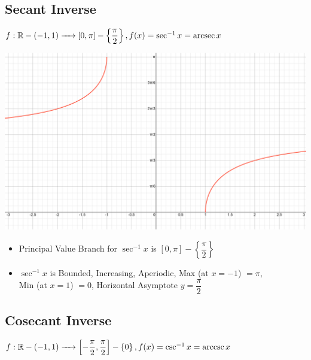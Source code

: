 \documentclass{article}
\begin{document}
\subsection{Secant Inverse}
$f: \mathbb{R}-(-1,1) \xrightarrow{\hspace{4mm}} \left[0,\pi\right]-\left\{\dfrac{\pi}{2}\right\}, f(x)=\sec^{-1}x=\arcsec x$
\begin{center}
    \includegraphics[scale=0.5]{graph_5.png}
\end{center}
\begin{itemize}
    \item Principal Value Branch for $\sec^{-1}x$ is $\left[0,\pi\right]-\left\{\dfrac{\pi}{2}\right\}$
    \item $\sec^{-1}x$ is Bounded, Increasing, Aperiodic, Max (at $x=-1$) $=\pi$, 
    \\Min (at $x=1$) $=0$, Horizontal Asymptote $y=\dfrac{\pi}{2}$
\end{itemize}
\newpage

\subsection{Cosecant Inverse}
$f:\mathbb{R}-(-1,1) \xrightarrow{\hspace{4mm}} \left[-\dfrac{\pi}{2},\dfrac{\pi}{2}\right]-\left\{0\right\}, f(x)=\csc^{-1}x=\arccsc x$
\end{document}
